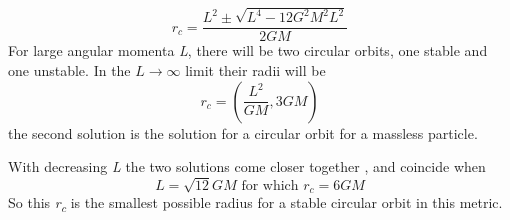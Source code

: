 \begin{equation}
	r_{c} = \frac{L^{2} \pm \sqrt{ L^{4} - 12G^{2} M^{2}L^{2}}}{2GM}
\end{equation}
For large angular momenta \emph{L}, there will be two circular orbits, one stable and one unstable. In the $L \to  \infty$ limit their radii will be
\begin{equation}
r_{c} = \left( \frac{L^{2}}{GM}, 3GM \right)
\end{equation}
the second solution is the solution for a circular orbit for a massless particle.\par
With decreasing \emph{ L} the two solutions come closer together , and coincide when 
\[
	L = \sqrt{12}GM \text{ for which } r_{c} = 6GM
\]
So this \emph{r\textsubscript{c}} is the smallest possible radius for a stable circular orbit in this metric.




















